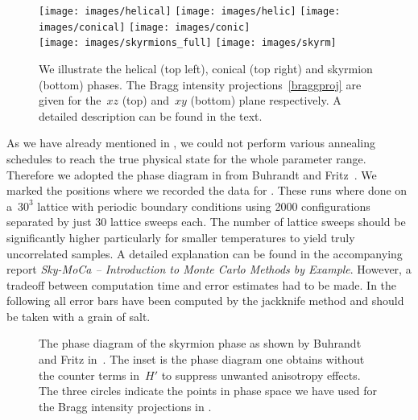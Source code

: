 \begin{figure}[H]
  \centering
  \texttt{[image: images/helical]}
  \hspace{0.5cm}
  \texttt{[image: images/helic]}
  \hfill
  \texttt{[image: images/conical]}
  \hspace{0.5cm}
  \texttt{[image: images/conic]}\\
  \vspace{1.5cm}
  \texttt{[image: images/skyrmions\_full]}
  \hspace{1cm}
  \texttt{[image: images/skyrm]}
  \caption{We illustrate the helical (top left), conical (top right) and
  skyrmion (bottom) phases. The Bragg intensity projections~\eqref{braggproj}
  are given for the~$xz$ (top) and~$xy$ (bottom) plane respectively. A detailed
  description can be found in the text.}
\label{fig:phases}
\end{figure}

As we have already mentioned in , we could not perform
various annealing schedules to reach the true physical state for the whole
parameter range. Therefore we adopted the phase diagram in 
from Buhrandt and Fritz~\cite{skyrmion}. We marked the positions where we
recorded the data for . These runs where done on a~$30^3$
lattice with periodic boundary conditions using 2000 configurations separated by
just 30 lattice sweeps each. The number of lattice sweeps should be
significantly higher particularly for smaller temperatures to yield truly
uncorrelated samples. A detailed explanation can be found in the accompanying
report \emph{Sky-MoCa -- Introduction to Monte Carlo Methods by Example}.
However, a tradeoff between computation time and error estimates had to be made.
In the following all error bars have been computed by the jackknife method and
should be taken with a grain of salt.

\begin{figure}[H]
  \centering
  \caption{The phase diagram of the skyrmion phase as shown by Buhrandt and
  Fritz in~\cite{skyrmion}. The inset is the phase diagram one obtains without
  the counter terms in~$H'$ to suppress unwanted anisotropy effects. The three
  circles indicate the points in phase space we have used for the Bragg
  intensity projections in .}
\label{fig:diagram}
\end{figure}
%

